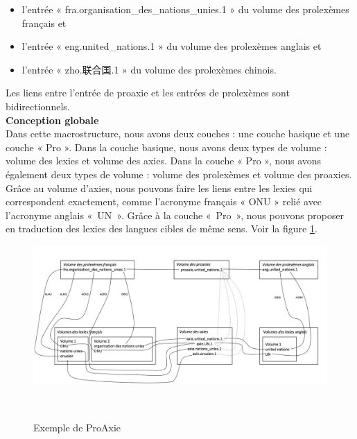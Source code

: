 \documentclass[10pt,a4paper,twoside]{article}
\newcommand{\Chinois}[1]{{\fontspec[Scale=0.9]{STSong}#1}}
\begin{document}
\begin{itemize}
\item l’entrée « fra.organisation\_des\_nations\_unies.1 » du volume des prolexèmes français et 
\item l’entrée « eng.united\_nations.1 » du volume des prolexèmes anglais et
\item l’entrée « zho.\Chinois{联合国}.1 » du volume des prolexèmes chinois.
\end{itemize}
Les liens entre l'entrée de proaxie et les entrées de prolexèmes sont bidirectionnels.\\

\textbf{Conception globale}\\
Dans cette macrostructure, nous avons deux couches : une couche basique et une couche « Pro ».  Dans la couche basique, nous avons deux types de volume : volume des lexies et volume des axies. Dans la couche « Pro », nous avons également deux types de volume : volume des prolexèmes et volume des proaxies.
Grâce au volume d'axies, nous pouvons faire les liens entre les lexies qui correspondent exactement, comme l'acronyme français « ONU » relié avec l'acronyme anglais « UN ». Grâce à la couche « Pro »,  nous pouvons proposer en traduction des lexies des langues cibles de même sens.  Voir la figure \ref{image-proaxie}.

\begin{figure}[htbp] 
\begin{center} 
\includegraphics[width=14cm]{images/proaxie_2-etages.jpg}
\end{center} 
\caption{Exemple de ProAxie} \label{image-proaxie} \
\end{figure}
\end{document}
